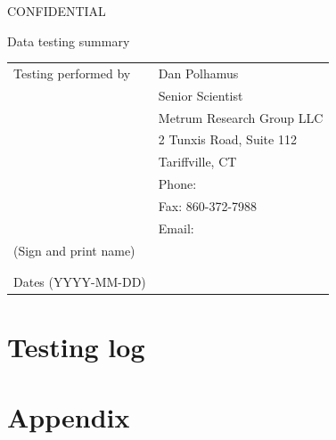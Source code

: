 \documentclass{article}
\newcommand{\topic}{Data testing summary}
\newcommand{\testinglog}{data-testing-log-complete.pdf}
\begin{document}
\vspace*{1cm}
\begin{center}
{\large CONFIDENTIAL} 


\vspace*{1cm}


\vspace*{1cm}

{\Large \topic}
\vspace{3.0cm}
\end{center}

\newpage
\vspace*{1cm}
\begin{center}
\vspace{3.0cm}

\begin{tabular}{|l|l|}\hline
Testing performed by &   Dan Polhamus\\
                      &  Senior Scientist \\
                      &  Metrum Research Group LLC \\
                      &  2 Tunxis Road, Suite 112\\
                      &  Tariffville, CT\\
                      &  Phone:  \\
                      &  Fax: 860-372-7988 \\
                      &  Email:  \\\hline
 (Sign and print name) & \\
                       & \\
                       & \\\hline
Dates (YYYY-MM-DD)     &               \\\hline



\end{tabular}

\end{center}

\newpage

\section*{Testing log}



\newpage


\section*{Appendix}
\end{document}
